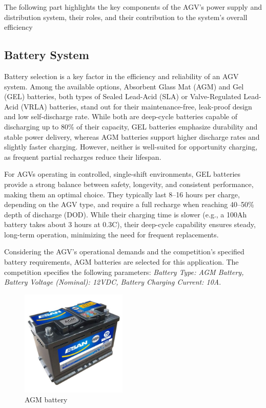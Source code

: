 \documentclass[../../main]{subfiles}
\begin{document}
The following part highlights the key components of the AGV's power supply 
and distribution system, their roles, and their contribution to the 
system's overall efficiency

\subsection{Battery System}

Battery selection is a key factor in the efficiency and reliability of an AGV system. 
Among the available options, Absorbent Glass Mat (AGM) and Gel (GEL) batteries, 
both types of Sealed Lead-Acid (SLA) or Valve-Regulated Lead-Acid (VRLA) batteries, 
stand out for their maintenance-free, leak-proof design and low self-discharge rate. 
While both are deep-cycle batteries capable of discharging up to 80\% of their capacity, 
GEL batteries emphasize durability and stable power delivery, whereas AGM batteries 
support higher discharge rates and slightly faster charging. 
However, neither is well-suited for opportunity charging, as frequent partial recharges reduce their lifespan.

For AGVs operating in controlled, single-shift environments, 
GEL batteries provide a strong balance between safety, longevity, and consistent performance, 
making them an optimal choice. They typically last 8--16 hours per charge, depending on the AGV type, 
and require a full recharge when reaching 40--50\% depth of discharge (DOD). 
While their charging time is slower (e.g., a 100Ah battery takes about 3 hours at 0.3C), 
their deep-cycle capability ensures steady, long-term operation, minimizing the need for frequent replacements.

Considering the AGV’s operational demands and the competition's specified battery requirements, 
AGM batteries are selected for this application. The competition specifies the following parameters: 
\textit{Battery Type: AGM Battery, Battery Voltage (Nominal): 12VDC, Battery Charging Current: 10A}.

\begin{figure}[H]
    \centering
\includegraphics[width=0.45\textwidth]{fig/battery.jpg}
\caption{AGM battery}
\label{AGM battery} %
\end{figure}
\end{document}
